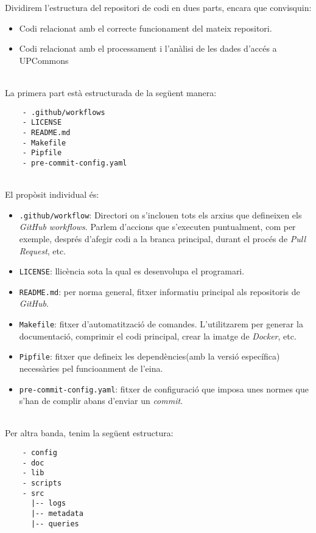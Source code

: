 \noindent
Dividirem l'estructura del repositori de codi en dues parts, encara que convisquin:
\begin{itemize}
    \item Codi relacionat amb el correcte funcionament del mateix repositori.
    \item Codi relacionat amb el processament i l'anàlisi de les dades d'accés a \gls{UPCommons}
\end{itemize}

\noindent \\
La primera part està estructurada de la següent manera:

\begin{verbatim}
    - .github/workflows
    - LICENSE
    - README.md
    - Makefile
    - Pipfile
    - pre-commit-config.yaml
\end{verbatim}

\noindent \\
El propòsit individual és:

\begin{itemize}
    \item \texttt{.github/workflow}: Directori on s'inclouen tots els arxius que defineixen els \textit{\gls{GitHub}} \textit{workflows}.
    Parlem d'accions que s'executen puntualment, com per exemple, després d'afegir codi a la branca principal, durant el procés de \textit{Pull Request}, etc.
    \item \texttt{LICENSE}: llicència sota la qual es desenvolupa el programari.
    \item \texttt{README.md}: per norma general, fitxer informatiu principal als repositoris de \textit{\gls{GitHub}}.
    \item \texttt{Makefile}: fitxer d'automatització de comandes.
    L'utilitzarem per generar la documentació, comprimir el codi principal, crear la imatge de \textit{\gls{Docker}}, etc.
    \item \texttt{Pipfile}: fitxer que defineix les dependències(amb la versió específica) necessàries pel funcioanment de l'eina.
    \item \texttt{pre-commit-config.yaml}: fitxer de configuració que imposa unes normes que s'han de complir abans d'enviar un \textit{\gls{commit}}.
\end{itemize}

\clearpage

\noindent \\
Per altra banda, tenim la següent estructura:

\begin{verbatim}
    - config
    - doc
    - lib
    - scripts
    - src
      |-- logs
      |-- metadata
      |-- queries
\end{verbatim}

